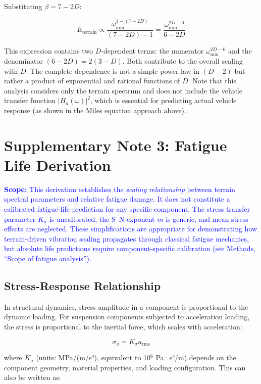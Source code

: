 \documentclass[11pt]{article}
\begin{document}
Substituting $\beta = 7-2D$:

\begin{equation}
E_{\text{terrain}} \propto \frac{\omega_{\min}^{1-(7-2D)}}{(7-2D)-1} = \frac{\omega_{\min}^{2D-6}}{6-2D}
\end{equation}

This expression contains two $D$-dependent terms: the numerator $\omega_{\min}^{2D-6}$ and the denominator $(6-2D) = 2(3-D)$. Both contribute to the overall scaling with $D$. The complete dependence is not a simple power law in $(D-2)$ but rather a product of exponential and rational functions of $D$. Note that this analysis considers only the terrain spectrum and does not include the vehicle transfer function $|H_a(\omega)|^2$, which is essential for predicting actual vehicle response (as shown in the Miles equation approach above).

\section{Supplementary Note 3: Fatigue Life Derivation}

\textcolor{blue}{\textbf{Scope:} This derivation establishes the \emph{scaling relationship} between terrain spectral parameters and relative fatigue damage. It does not constitute a calibrated fatigue-life prediction for any specific component. The stress transfer parameter $K_\sigma$ is uncalibrated, the S--N exponent $m$ is generic, and mean stress effects are neglected. These simplifications are appropriate for demonstrating how terrain-driven vibration scaling propagates through classical fatigue mechanics, but absolute life predictions require component-specific calibration (see Methods, ``Scope of fatigue analysis'').}

\subsection{Stress-Response Relationship}

In structural dynamics, stress amplitude in a component is proportional to the dynamic loading. For suspension components subjected to acceleration loading, the stress is proportional to the inertial force, which scales with acceleration:

\begin{equation}
\sigma_a = K_\sigma a_{\text{rms}}
\end{equation}

where $K_\sigma$ (units: MPa/(m/s²), equivalent to 10$^6$ Pa·s²/m) depends on the component geometry, material properties, and loading configuration. This can also be written as:
\end{document}

